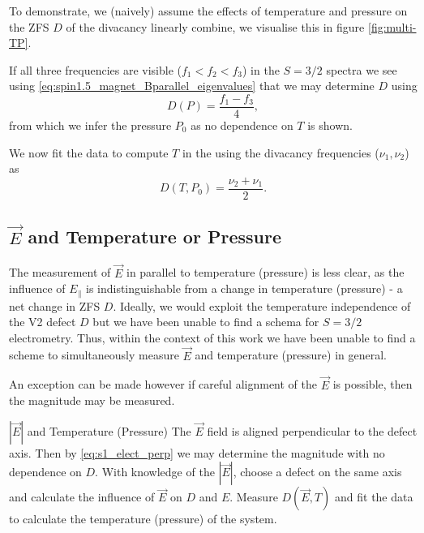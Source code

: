 To demonstrate, we (naively) assume the effects of temperature and pressure on the ZFS $D$ of the divacancy linearly combine, we visualise this in figure \ref{fig:multi-TP}. 

If all three frequencies are visible ($f_1 < f_2 < f_3$) in the $S=3/2$ spectra we see using \eqref{eq:spin1.5_magnet_Bparallel_eigenvalues} that we may determine $D$ using 
\begin{equation}
    D(P) = \frac{f_1 -f_3 }{4},
    \label{eq:}
\end{equation}
from which we infer the pressure $P_0$ as no dependence on $T$ is shown.     

We now fit the data to compute $T$ in the using the divacancy frequencies ($\nu_1, \nu_2$) as 
\begin{equation}
    D(T, P_0) = \frac{\nu_2 + \nu_1}{2}.
    \label{eq:}
\end{equation}

\subsection{$\vec{E}$ and Temperature or Pressure}\label{multi-E-pressure}
The measurement of $\vec{E}$ in parallel to temperature (pressure) is less clear, as the influence of $E_\parallel$ is indistinguishable from a change in temperature (pressure) - a net change in ZFS $D$. Ideally, we would exploit the temperature independence of the V2 defect $D$ but we have been unable to find a schema for $S=3/2$ electrometry. 
Thus, within the context of this work we have been unable to find a scheme to simultaneously measure $\vec{E}$ and temperature (pressure) in general.  

An exception can be made however if careful alignment of the $\vec{E}$ is possible, then the magnitude may be measured. 

\begin{proposal}{$|\vec{E}|$ and Temperature (Pressure)}
    The $\vec{E}$ field is aligned perpendicular to the defect axis. Then by \eqref{eq:s1_elect_perp} we may determine the magnitude with no dependence on $D$. With knowledge of the $|\vec{E}|$, choose a defect on the same axis and calculate the influence of $\vec{E}$ on $D$ and $E$. Measure $D(\vec{E}, T)$ and fit the data to calculate the temperature (pressure) of the system. 
\end{proposal}

